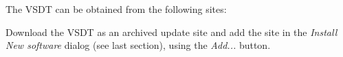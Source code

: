 The VSDT can be obtained from the following sites:
\begin{center}
	\downloadsites
\end{center}

Download the VSDT as an archived update site and add the site in the \emph{Install
New software} dialog (see last section), using the \emph{Add...} button.


